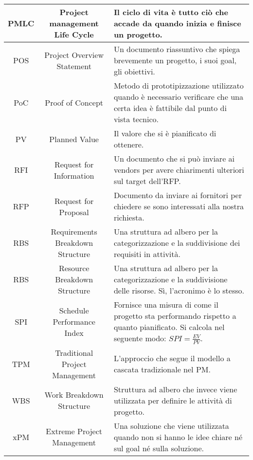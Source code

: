 \begin{tabularx}{\textwidth}{|c|c|X|}
	\hline
	PMLC & Project management Life Cycle & Il ciclo di vita è tutto ciò che accade da quando inizia e finisce un progetto.\\
	\hline
	POS & Project Overview Statement & Un documento riassuntivo che spiega brevemente un progetto, i suoi goal, gli obiettivi.\\
	\hline
	PoC & Proof of Concept & Metodo di prototipizzazione utilizzato quando è necessario verificare che una certa idea è fattibile dal punto di vista tecnico.\\
	\hline
	PV & Planned Value & Il valore che si è pianificato di ottenere.\\
	\hline
	RFI & Request for Information & Un documento che si può inviare ai vendors per avere chiarimenti ulteriori sul target dell'RFP.\\
	\hline
	RFP & Request for Proposal & Documento da inviare ai fornitori per chiedere se sono interessati alla nostra richiesta.\\
	\hline
	RBS & Requirements Breakdown Structure & Una struttura ad albero per la categorizzazione e la suddivisione dei requisiti in attività.\\
	\hline
	RBS & Resource Breakdown Structure & Una struttura ad albero per la categorizzazione e la suddivisione delle risorse. Sì, l'acronimo è lo stesso.\\
	\hline
	SPI & Schedule Performance Index & Fornisce una misura di come il progetto sta performando rispetto a quanto pianificato. Si calcola nel seguente modo: $SPI = \frac{EV}{PV}$.\\
	\hline
	TPM & Traditional Project Management & L'approccio che segue il modello a cascata tradizionale nel PM.\\
	\hline
	WBS & Work Breakdown Structure & Struttura ad albero che invece viene utilizzata per definire le attività di progetto.\\
	\hline
	xPM & Extreme Project Management &  Una soluzione che viene utilizzata quando non si hanno le idee chiare né sul goal né sulla soluzione.\\
	\hline
\end{tabularx}
